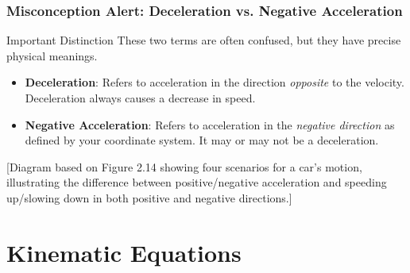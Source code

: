 \documentclass{beamer}
\begin{document}
\begin{frame}
\frametitle{Misconception Alert: Deceleration vs. Negative Acceleration}
\begin{block}{Important Distinction}
These two terms are often confused, but they have precise physical meanings.
\end{block}

\begin{itemize}
    \item \textbf{Deceleration}: Refers to acceleration in the direction \textit{opposite} to the velocity. Deceleration always causes a decrease in speed.
    \item \textbf{Negative Acceleration}: Refers to acceleration in the \textit{negative direction} as defined by your coordinate system. It may or may not be a deceleration.
\end{itemize}
\vfill
\alert{[Diagram based on Figure 2.14 showing four scenarios for a car's motion, illustrating the difference between positive/negative acceleration and speeding up/slowing down in both positive and negative directions.]}
\end{frame}

\section{Kinematic Equations}
\end{document}
